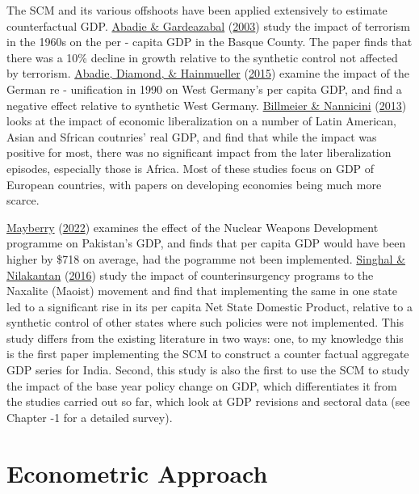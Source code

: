 \documentclass[12pt,nobind, a4paper]{reedthesis}
\begin{document}
 The SCM and its various offshoots have been applied extensively to estimate counterfactual GDP. \protect\hyperlink{ref-abadie_economic_2003}{Abadie \& Gardeazabal} (\protect\hyperlink{ref-abadie_economic_2003}{2003}) study the impact of terrorism in the 1960s on the per - capita GDP in the Basque County. The paper finds that there was a 10\% decline in growth relative to the synthetic control not affected by terrorism. \protect\hyperlink{ref-abadie_comparative_2015}{Abadie, Diamond, \& Hainmueller} (\protect\hyperlink{ref-abadie_comparative_2015}{2015}) examine the impact of the German re - unification in 1990 on West Germany's per capita GDP, and find a negative effect relative to synthetic West Germany. \protect\hyperlink{ref-billmeier_assessing_2013}{Billmeier \& Nannicini} (\protect\hyperlink{ref-billmeier_assessing_2013}{2013}) looks at the impact of economic liberalization on a number of Latin American, Asian and Sfrican coutnries' real GDP, and find that while the impact was positive for most, there was no significant impact from the later liberalization episodes, especially those is Africa. Most of these studies focus on GDP of European countries, with papers on developing economies being much more scarce.
 \linebreak

 \protect\hyperlink{ref-mayberry_economic_2022}{Mayberry} (\protect\hyperlink{ref-mayberry_economic_2022}{2022}) examines the effect of the Nuclear Weapons Development programme on Pakistan's GDP, and finds that per capita GDP would have been higher by \$718 on average, had the pogramme not been implemented. \protect\hyperlink{ref-singhal_economic_2016}{Singhal \& Nilakantan} (\protect\hyperlink{ref-singhal_economic_2016}{2016}) study the impact of counterinsurgency programs to the Naxalite (Maoist) movement and find that implementing the same in one state led to a significant rise in its per capita Net State Domestic Product, relative to a synthetic control of other states where such policies were not implemented. This study differs from the existing literature in two ways: one, to my knowledge this is the first paper implementing the SCM to construct a counter factual aggregate GDP series for India. Second, this study is also the first to use the SCM to study the impact of the base year policy change on GDP, which differentiates it from the studies carried out so far, which look at GDP revisions and sectoral data (see Chapter -1 for a detailed survey).

 \hypertarget{econometric-approach}{%
 \section{Econometric Approach}\label{econometric-approach}}
\end{document}
